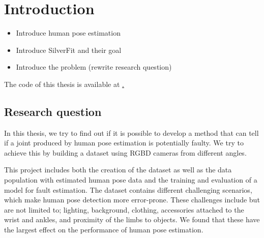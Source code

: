\chapter{Introduction}
\setcounter{page}{1}
\begin{itemize}
  \item Introduce human pose estimation
  \item Introduce SilverFit and their goal
  \item Introduce the problem (rewrite research question)
\end{itemize}

The code of this thesis is available at \href{https://github.com/LeonardoPohl/FESD}.

\section{Research question}

In this thesis, we try to find out if it is possible to develop a method that can tell if a joint produced by human pose estimation is potentially faulty. We try to achieve this by building a dataset using RGBD cameras from different angles.

This project includes both the creation of the dataset as well as the data population with estimated human pose data and the training and evaluation of a model for fault estimation. The dataset contains different challenging scenarios, which make human pose detection more error-prone. These challenges include but are not limited to; lighting, background, clothing, accessories attached to the wrist and ankles, and proximity of the limbs to objects. We found that these have the largest effect on the performance of human pose estimation. 
